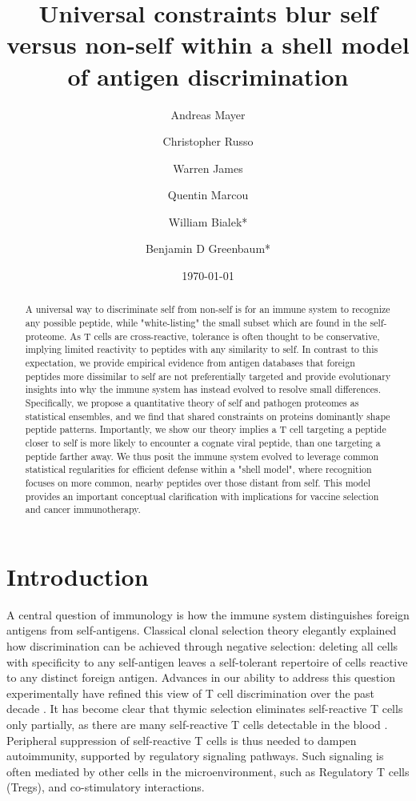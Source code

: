 \documentclass[superscriptaddress,twocolumn,pre]{revtex4}
\newcommand{\<}{\langle}
\renewcommand{\>}{\rangle}
\begin{document}
\title{Universal constraints blur self versus non-self within a shell model of antigen discrimination}
\author{Andreas Mayer}
\author{Christopher Russo}
\author{Warren James}
\author{Quentin Marcou}
\author{William Bialek*}
\author{Benjamin D Greenbaum*}
\date{\today}

\begin{abstract}
    A universal way to discriminate self from non-self is for an immune system to recognize any possible peptide, while "white-listing" the small subset which are found in the self-proteome. As T cells are cross-reactive, tolerance is often thought to be conservative, implying limited reactivity to peptides with any similarity to self. In contrast to this expectation, we provide empirical evidence from antigen databases that foreign peptides more dissimilar to self are not preferentially targeted and provide evolutionary insights into why the immune system has instead evolved to resolve small differences. Specifically, we propose a quantitative theory of self and pathogen proteomes as statistical ensembles, and we find that shared constraints on proteins dominantly shape peptide patterns. Importantly, we show our theory implies a T cell targeting a peptide closer to self is more likely to encounter a cognate viral peptide, than one targeting a peptide farther away. We thus posit the immune system evolved to leverage common statistical regularities for efficient defense within a "shell model", where recognition focuses on more common, nearby peptides over those distant from self. This model provides an important conceptual clarification with implications for vaccine selection and cancer immunotherapy.
\end{abstract}

\maketitle

\section{Introduction}

A central question of immunology is how the immune system distinguishes foreign antigens from self-antigens. Classical clonal selection theory elegantly explained how discrimination can be achieved through negative selection: deleting all cells with specificity to any self-antigen leaves a self-tolerant repertoire of cells reactive to any distinct foreign antigen. Advances in our ability to address this question experimentally have refined this view of T cell discrimination over the past decade \cite{Davis2015, Birnbaum2014}. It has become clear that thymic selection eliminates self-reactive T cells only partially, as there are many self-reactive T cells detectable in the blood \cite{Davis2015}. Peripheral suppression of self-reactive T cells is thus needed to dampen autoimmunity, supported by regulatory signaling pathways. Such signaling is often mediated by other cells in the microenvironment, such as Regulatory T cells (Tregs), and co-stimulatory interactions.
\end{document}
